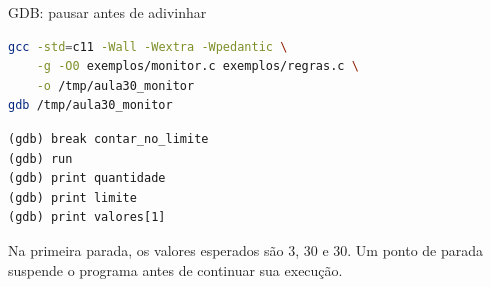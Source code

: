 \begin{frame}[fragile]{GDB: pausar antes de adivinhar}
\begin{lstlisting}[language=bash]
gcc -std=c11 -Wall -Wextra -Wpedantic \
    -g -O0 exemplos/monitor.c exemplos/regras.c \
    -o /tmp/aula30_monitor
gdb /tmp/aula30_monitor
\end{lstlisting}
\begin{lstlisting}[language={}]
(gdb) break contar_no_limite
(gdb) run
(gdb) print quantidade
(gdb) print limite
(gdb) print valores[1]
\end{lstlisting}
\small Na primeira parada, os valores esperados são 3, 30 e 30. Um ponto de parada suspende o programa antes de continuar sua execução.
\end{frame}
